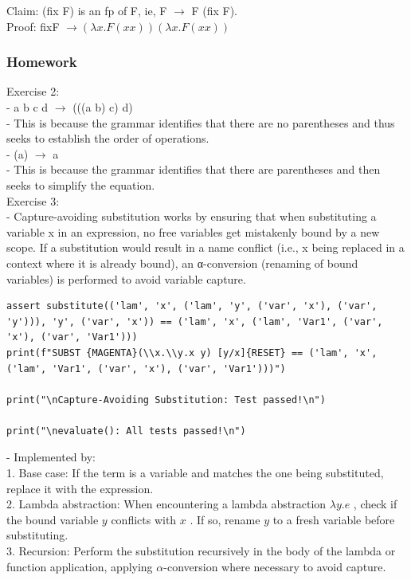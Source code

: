 \documentclass{article}
\theoremstyle{theorem}
\theoremstyle{definition}
\theoremstyle{remark}
\begin{document}
Claim: (fix F) is an fp of F, ie, F  $\rightarrow$ F (fix F). \\
Proof: fixF $\rightarrow (\lambda x. F (xx)) (\lambda x.F(xx))$

\subsubsection*{Homework}

Exercise 2: \\
- a b c d $\rightarrow$ (((a b) c) d) \\
  - This is because the grammar identifies that there are no parentheses and thus seeks to establish the order of operations. \\
- (a) $\rightarrow$ a \\
  - This is because the grammar identifies that there are parentheses and then seeks to simplify the equation. \\

Exercise 3: \\
  - Capture-avoiding substitution works by ensuring that when substituting a variable  x  in an expression, no free variables get mistakenly bound by a new scope. If a substitution would result in a name conflict (i.e.,  x  being replaced in a context where it is already bound), an α-conversion (renaming of bound variables) is performed to avoid variable capture.

\begin{lstlisting}
assert substitute(('lam', 'x', ('lam', 'y', ('var', 'x'), ('var', 'y'))), 'y', ('var', 'x')) == ('lam', 'x', ('lam', 'Var1', ('var', 'x'), ('var', 'Var1')))
print(f"SUBST {MAGENTA}(\\x.\\y.x y) [y/x]{RESET} == ('lam', 'x', ('lam', 'Var1', ('var', 'x'), ('var', 'Var1')))")

print("\nCapture-Avoiding Substitution: Test passed!\n")

print("\nevaluate(): All tests passed!\n")
\end{lstlisting}

  - Implemented by: \\
  1.	Base case: If the term is a variable and matches the one being substituted, replace it with the expression. \\
  2.	Lambda abstraction: When encountering a lambda abstraction  $\lambda y. e$ , check if the bound variable  $y$  conflicts with  $x$ . If so, rename  $y$  to a fresh variable before substituting. \\
  3.	Recursion: Perform the substitution recursively in the body of the lambda or function application, applying $\alpha$-conversion where necessary to avoid capture. \\
\end{document}
